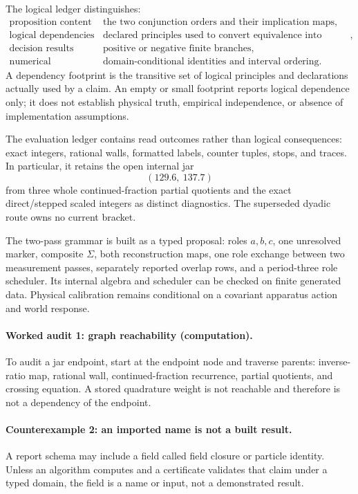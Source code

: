 The logical ledger distinguishes:
\[
\begin{array}{ll}
\text{proposition content}&\text{the two conjunction orders and their implication maps},\\
\text{logical dependencies}&\text{declared principles used to convert equivalence into proposition equality},\\
\text{decision results}&\text{positive or negative finite branches},\\
\text{numerical implications}&\text{domain-conditional identities and interval ordering}.
\end{array}
\]
A dependency footprint is the transitive set of logical principles and declarations actually used by a claim.
An empty or small footprint reports logical dependence only; it does not establish physical truth, empirical
independence, or absence of implementation assumptions.

The evaluation ledger contains read outcomes rather than logical consequences: exact integers, rational walls,
formatted labels, counter tuples, stops, and traces.  In particular, it retains the open internal jar
\[
                         (129.6,\ 137.7)
\]
from three whole continued-fraction partial quotients and the exact direct/stepped scaled integers as distinct
diagnostics.  The superseded dyadic route owns no current bracket.

The two-pass grammar is built as a typed proposal: roles \(a,b,c\), one unresolved marker, composite
\(\Sigma\), both reconstruction maps, one role exchange between two measurement passes, separately reported overlap rows,
and a period-three role scheduler.  Its internal algebra and scheduler can be checked on finite generated data.
Physical calibration remains conditional on a covariant apparatus action and world response.

\paragraph{Worked audit 1: graph reachability (computation).}
To audit a jar endpoint, start at the endpoint node and traverse parents: inverse-ratio map, rational wall,
continued-fraction recurrence, partial quotients, and crossing equation.  A stored quadrature weight is not reachable
and therefore is not a dependency of the endpoint.

\paragraph{Counterexample 2: an imported name is not a built result.}
A report schema may include a field called field closure or particle identity.  Unless an algorithm computes and a
certificate validates that claim under a typed domain, the field is a name or input, not a demonstrated result.

